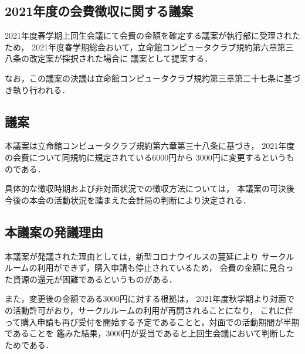 \subsection*{2021年度の会費徴収に関する議案}

2021年度春学期上回生会議にて会費の金額を確定する議案が執行部に受理されたため，
2021年度春学期総会おいて，立命館コンピュータクラブ規約第六章第三八条の改定案が採択された場合に
議案として提案する．

なお，この議案の決議は立命館コンピュータクラブ規約第三章第二十七条に基づき執り行われる．


\subsection*{議案}
本議案は立命館コンピュータクラブ規約第六章第三十八条に基づき，
2021年度の会費について同規約に規定されている6000円から
3000円に変更するというものである．

具体的な徴収時期および非対面状況での徴収方法については，
本議案の可決後今後の本会の活動状況を踏まえた会計局の判断により決定される．


\subsection*{本議案の発議理由}
本議案が発議された理由としては，新型コロナウイルスの蔓延により
サークルルームの利用ができず，購入申請も停止されているため，
会費の金額に見合った資源の還元が困難であるというものがある．

また，変更後の金額である3000円に対する根拠は，
2021年度秋学期より対面での活動許可がおり，サークルルームの利用が再開されることになり，
これに伴って購入申請も再び受付を開始する予定であることと，対面での活動期間が半期であることを
鑑みた結果，3000円が妥当であると上回生会議において判断したためである．
